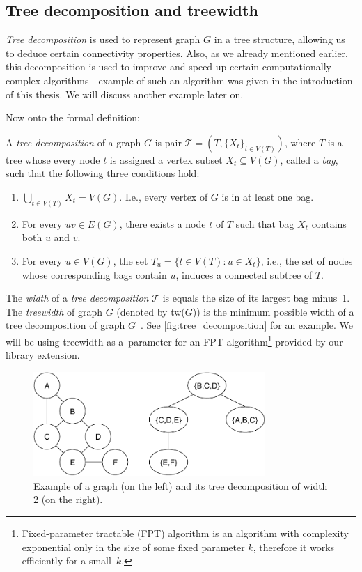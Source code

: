 \documentclass[thesis=B,english]{FITthesis}[2019/03/21]
\begin{document}
\subsection{Tree decomposition and treewidth}
\emph{Tree decomposition} is used to represent graph $G$ in a tree structure, allowing us to deduce certain connectivity properties. Also, as we already mentioned earlier, this decomposition is used to improve and speed up certain computationally complex algorithms---example of such an algorithm was given in the introduction of this thesis. We will discuss another example later on.\bigskip

\noindent Now onto the formal definition:

A \emph{tree decomposition} of a graph $G$ is pair $\mathcal{T} = (T, \{X_t\}_{t \in V(T)})$, where $T$ is a tree whose every node $t$ is assigned a vertex subset $X_t \subseteq V(G)$, called a \emph{bag}, such that the following three conditions hold:
\begin{enumerate}
    \item $\bigcup_{t \in V(T)} X_t = V(G)$. I.e., every vertex of $G$ is in at least one bag.
    \item For every $uv \in E(G)$, there exists a node $t$ of $T$ such that bag $X_t$ contains both $u$ and $v$.
    \item For every $u \in V(G)$, the set $T_u = \{t \in V(T) : u \in X_t \}$, i.e., the set of nodes whose corresponding bags contain $u$, induces a connected subtree of $T$.
\end{enumerate}

The \emph{width} of a \emph{tree decomposition} $\mathcal{T}$ is equals the size of its largest bag minus~1. The \emph{treewidth} of graph $G$ (denoted by tw($G$)) is the minimum possible width of a tree decomposition of graph $G$~\cite[Chap. 7.2]{param_algo}. See \autoref{fig:tree_decomposition} for an example. We will be using treewidth as a~parameter for an FPT algorithm\footnote{Fixed-parameter tractable (FPT) algorithm is an algorithm with complexity exponential only in the size of some fixed parameter $k$, therefore it works efficiently for a small~$k$.} provided by our library extension.

\begin{figure}[H]
	\centering
 	\includegraphics[width=8.8cm]{img/graph-decomposition.pdf}
 	\caption[Example of a graph and its tree decomposition]{Example of a graph (on the left) and its tree decomposition  of width 2 (on the right).}
 	\label{fig:tree_decomposition}
\end{figure}
\end{document}
